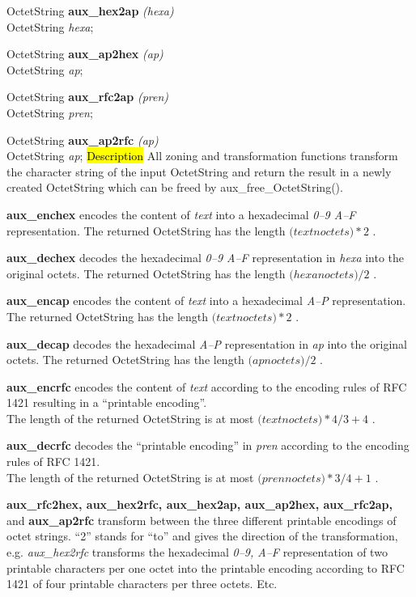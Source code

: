 OctetString  {\bf *aux\_hex2ap} {\em (hexa)} \\
OctetString {\em *hexa};

OctetString  {\bf *aux\_ap2hex} {\em (ap)} \\
OctetString {\em *ap};

OctetString  {\bf *aux\_rfc2ap} {\em (pren)} \\
OctetString {\em *pren};

OctetString  {\bf *aux\_ap2rfc} {\em (ap)} \\
OctetString {\em *ap};
\hl{Description}
All zoning and transformation functions transform the character string
of the input OctetString
and return the result in a newly created OctetString which
can be freed by aux\_free\_OctetString().

{\bf aux\_enchex} encodes the content of {\em text}
into a hexadecimal {\em 0--9 A--F} representation.
The returned OctetString has the length
$(text$\pf $noctets)*2$ .

{\bf aux\_dechex} decodes the hexadecimal {\em 0--9 A--F}
representation in {\em hexa}
into the original octets.
The returned OctetString has the length
$(hexa$\pf $noctets)/2$ .

{\bf aux\_encap} encodes the content of {\em text}
into a hexadecimal {\em A--P} representation.
The returned OctetString has the length
$(text$\pf $noctets)*2$ .

{\bf aux\_decap} decodes the hexadecimal {\em A--P}
representation in {\em ap}
into the original octets.
The returned OctetString has the length
$(ap$\pf $noctets)/2$ .

{\bf aux\_encrfc} encodes the content of {\em text}
according to the encoding rules of RFC 1421
resulting in a ``printable encoding''. \\
The length of the returned OctetString is at most
$(text$\pf $noctets)*4/3+4$ .

{\bf aux\_decrfc} decodes the ``printable encoding'' in {\em pren}
according to the encoding rules of RFC 1421. \\
The length of the returned OctetString is at most
$(pren$\pf $noctets)*3/4+1$ .

{\bf aux\_rfc2hex, aux\_hex2rfc, aux\_hex2ap, aux\_ap2hex,
aux\_rfc2ap,} and {\bf aux\_ap2rfc}
transform between the three different printable encodings of
octet strings. ``2'' stands for ``to'' and gives the direction
of the transformation, e.g.
{\em aux\_hex2rfc} transforms the hexadecimal {\em 0--9, A--F}
representation of two printable characters per one octet
into the printable encoding according to RFC 1421 of
four printable characters per three octets. Etc.

